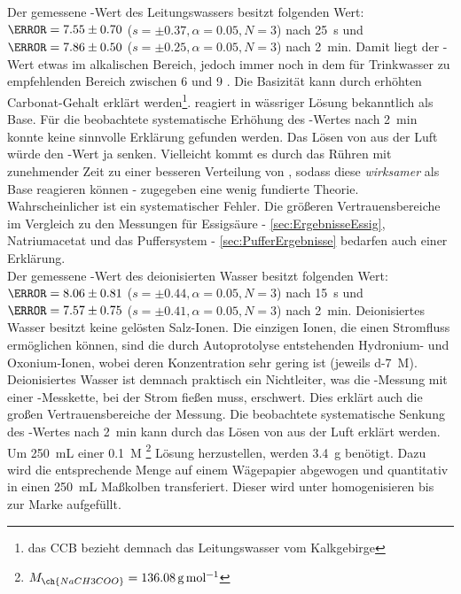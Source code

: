 \documentclass{article}
\begin{document}
         Der gemessene \pH-Wert des Leitungswassers besitzt folgenden Wert: $\pH = \num[separate-uncertainty]{7.55 \pm 0.70}$ ($s = \pm 0.37,\alpha = 0.05, N = 3$) nach \SI[mode=text]{25}{\second} und $\pH = \num[separate-uncertainty]{7.86 \pm 0.50}$ ($s = \pm 0.25,\alpha = 0.05, N = 3$) nach \SI[mode=text]{2}{\minute}. Damit liegt der \pH-Wert etwas im alkalischen Bereich, jedoch immer noch in dem für Trinkwasser zu empfehlenden Bereich zwischen 6 und 9 \cite{LeitungswasserRichtlinien}. Die Basizität kann durch erhöhten Carbonat-Gehalt erklärt werden\footnote{das CCB bezieht demnach das Leitungswasser vom Kalkgebirge}.  reagiert in wässriger Lösung bekanntlich als Base. Für die beobachtete systematische Erhöhung des \pH-Wertes nach \SI[mode=text]{2}{\minute} konnte keine sinnvolle Erklärung gefunden werden. Das Lösen von  aus der Luft würde den \pH-Wert ja senken. Vielleicht kommt es durch das Rühren mit zunehmender Zeit zu einer besseren Verteilung von , sodass diese \textit{wirksamer} als Base reagieren können - zugegeben eine wenig fundierte Theorie. Wahrscheinlicher ist ein systematischer Fehler. Die größeren Vertrauensbereiche im Vergleich zu den Messungen für Essigsäure - \ref{sec:ErgebnisseEssig}, Natriumacetat und das Puffersystem - \ref{sec:PufferErgebnisse} bedarfen auch einer Erklärung. \\
         
         Der gemessene \pH-Wert des deionisierten Wasser besitzt folgenden Wert: $\pH = \num[separate-uncertainty]{8.06 \pm 0.81}$ ($s = \pm 0.44,\alpha = 0.05, N = 3$) nach \SI[mode=text]{15}{\second} und $\pH = \num[separate-uncertainty]{7.57 \pm 0.75}$ ($s = \pm 0.41,\alpha = 0.05, N = 3$) nach \SI[mode=text]{2}{\minute}. Deionisiertes Wasser besitzt keine gelösten Salz-Ionen. Die einzigen Ionen, die einen Stromfluss ermöglichen können, sind die durch Autoprotolyse entstehenden Hydronium- und Oxonium-Ionen, wobei deren Konzentration sehr gering ist (jeweils \SI[mode=text]{d-7}{M}). Deionisiertes Wasser ist demnach praktisch ein Nichtleiter, was die \pH-Messung mit einer \pH-Messkette, bei der Strom fießen muss, erschwert. Dies erklärt auch die großen Vertrauensbereiche der Messung. Die beobachtete systematische Senkung des \pH-Wertes nach \SI[mode=text]{2}{\minute} kann durch das Lösen von  aus der Luft erklärt werden. \\
         
         Um \SI[mode=text]{250}{\milli\liter} einer \SI[mode=text]{0.1}{M} \footnote{$M_{\ch{NaCH3COO}} = \SI[mode=text]{136.08}{\gram\per\mole}$} Lösung herzustellen, werden \SI[mode=text]{3.4}{\gram} benötigt. Dazu wird die entsprechende Menge auf einem Wägepapier abgewogen und quantitativ in einen \SI[mode=text]{250}{\milli\liter} Maßkolben transferiert. Dieser wird unter homogenisieren bis zur Marke aufgefüllt. 
    
\end{document}
